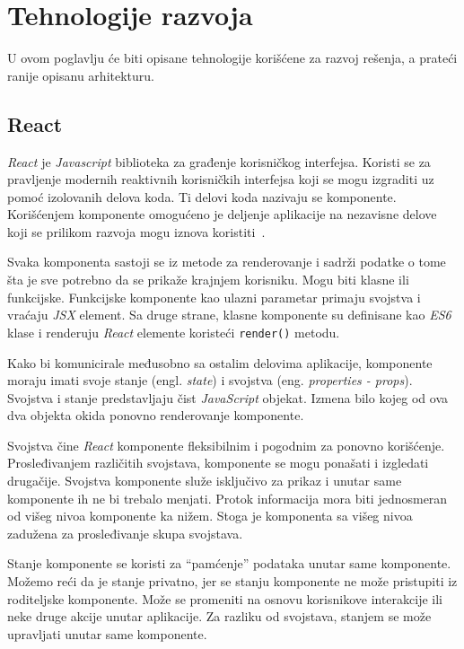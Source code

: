 \section{Tehnologije razvoja}\label{ch:tehnologije}

U ovom poglavlju će biti opisane tehnologije korišćene za razvoj rešenja, a prateći ranije opisanu arhitekturu.

\subsection{React}\label{sec:react}
\textit{React} je \textit{Javascript} biblioteka za građenje korisničkog interfejsa. Koristi se za pravljenje modernih 
reaktivnih korisničkih interfejsa koji se mogu izgraditi uz pomoć izolovanih delova koda. Ti delovi koda nazivaju 
se komponente. Korišćenjem komponente omogućeno je deljenje aplikacije na nezavisne delove koji se prilikom razvoja 
mogu iznova koristiti~\cite{react}.

Svaka komponenta sastoji se iz metode za renderovanje i sadrži podatke o tome šta je sve potrebno da se prikaže 
krajnjem korisniku. Mogu biti klasne ili funkcijske. Funkcijske komponente kao ulazni parametar primaju svojstva 
i vraćaju \textit{JSX} element. Sa druge strane, klasne komponente su definisane kao \textit{ES6} 
klase i renderuju \textit{React} elemente koristeći \texttt{render()} metodu. 

Kako bi komunicirale međusobno sa ostalim delovima aplikacije, komponente moraju imati svoje stanje (engl. \textit{state}) 
i svojstva (eng. \textit{properties - props}). Svojstva i stanje predstavljaju čist \textit{JavaScript} objekat. Izmena bilo kojeg 
od ova dva objekta okida ponovno renderovanje komponente. 

Svojstva čine \textit{React} komponente fleksibilnim i pogodnim za 
ponovno korišćenje. Prosleđivanjem različitih svojstava, komponente se mogu ponašati i izgledati drugačije. Svojstva komponente 
služe isključivo za prikaz i unutar same komponente ih ne bi trebalo menjati. Protok informacija mora biti jednosmeran od višeg 
nivoa komponente ka nižem. Stoga je komponenta sa višeg nivoa zadužena za prosleđivanje skupa svojstava.

Stanje komponente se koristi za “pamćenje” podataka unutar same komponente. Možemo reći da je stanje privatno, jer se stanju 
komponente ne može pristupiti iz roditeljske komponente. Može se promeniti na osnovu korisnikove interakcije ili neke druge 
akcije unutar aplikacije. Za razliku od svojstava, stanjem se može upravljati unutar same komponente.

